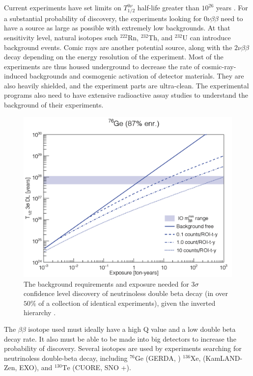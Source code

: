 Current experiments have set limits on $T^{0\nu}_{1/2}$ half-life greater than $10^{26}$ years \cite{KamLANDZen2018}.  For a substantial probability of discovery, the experiments looking for $0\nu\beta\beta$ need to have a source as large as possible with extremely low backgrounds. At that sensitivity level, natural isotopes such $^{222}$Rn, $^{232}$Th, and $^{232}$U can introduce background events. Comic rays are another potential source, along with the $2\nu\beta\beta$ decay depending on the energy resolution of the experiment. Most of the experiments are thus housed underground to decrease the rate of cosmic-ray-induced backgrounds and cosmogenic activation of detector materials. They are also heavily shielded, and the experiment parts are ultra-clean. The experimental programs also need to have extensive radioactive assay studies to understand the background of their experiments.

\begin{figure}
\centering
\includegraphics[width=0.6\linewidth]{ch1/figs/exposure_plot.png}
\caption{The background requirements and exposure needed for 3$\sigma$ confidence level discovery of neutrinoless double beta decay (in over $50\%$ of a collection of identical experiments), given the inverted hierarchy \cite{Gruszko:2017kfx}.}
\label{exposure_plot}
\end{figure}

The $\beta\beta$ isotope used must ideally have a high Q value and a low double beta decay rate. It also must be able to be made into big detectors to increase the probability of discovery. Several isotopes are used by experiments searching for neutrinoless double-beta decay, including ${}^{76}\mathrm{Ge}$ (GERDA\cite{GERDA_final}, {\MJD}\cite{mjd2013}) ${}^{136}\mathrm{Xe}$, (KamLAND-Zen\cite{KamLANDZen2018}, EXO\cite{Auger2012ar}), and ${}^{130}\mathrm{Te}$ (CUORE\cite{Arnaboldi2002du}, SNO +\cite{SNO_paper}). 


